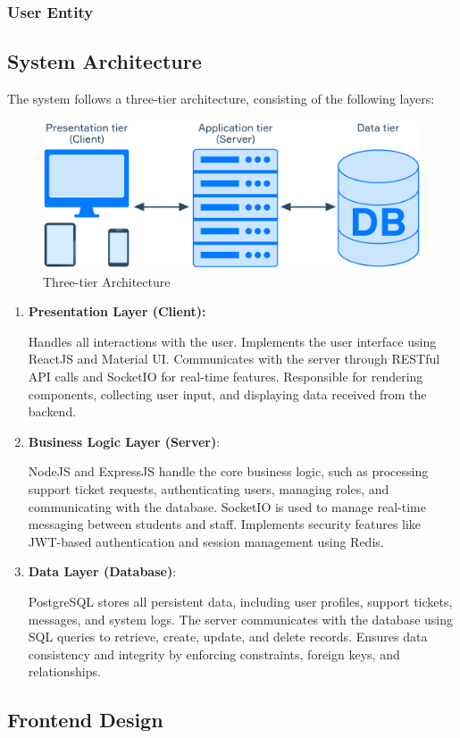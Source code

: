 	\subsubsection{User Entity}


\subsection{System Architecture}

The system follows a three-tier architecture, consisting of the following layers:

\begin{figure}[H]
	\centering
	\includegraphics[width=0.7\columnwidth]{graphics/3-tier-arch.pdf}
	\caption{Three-tier Architecture \cite{3-tier}}
	\label{fig:3-tier}
\end{figure}


\begin{enumerate}
	\item \textbf{Presentation Layer (Client):}
	
	Handles all interactions with the user.
	Implements the user interface using ReactJS and Material UI.
	Communicates with the server through RESTful API calls and SocketIO for real-time features.
	Responsible for rendering components, collecting user input, and displaying data received from the backend.
	
	\item \textbf{Business Logic Layer (Server)}:
	
	NodeJS and ExpressJS handle the core business logic, such as processing support ticket requests, authenticating users, managing roles, and communicating with the database.
	SocketIO is used to manage real-time messaging between students and staff.
	Implements security features like JWT-based authentication and session management using Redis.
	
	\item \textbf{ Data Layer (Database)}:
	
	PostgreSQL stores all persistent data, including user profiles, support tickets, messages, and system logs.
	The server communicates with the database using SQL queries to retrieve, create, update, and delete records.
	Ensures data consistency and integrity by enforcing constraints, foreign keys, and relationships.
	
\end{enumerate}


\subsection{Frontend Design}












%	
	


	